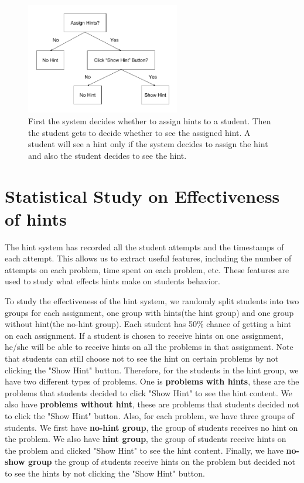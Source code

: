 \documentclass{article} %
\begin{document}
\begin{figure}[ht]
   \centering
   \includegraphics[width=0.6\textwidth]{image/Show_Hint.png}
   \caption{First the system decides whether to assign hints to a student. Then the student gets to decide whether to see the assigned hint. A student will see a hint only if the system decides to assign the hint and also the student decides to see the hint.}
   \label{fig:show_hint}
\end{figure}


\section{Statistical Study on Effectiveness of hints}
The hint system has recorded all the student attempts and the timestamps of each attempt. This allows us to extract useful features, including the number of attempts on each problem, time spent on each problem, etc. These features are used to study what effects hints make on students behavior.

To study the effectiveness of the hint system, we randomly split students into two groups for each assignment, one group with hints(the hint group) and one group without hint(the no-hint group). Each student has 50\% chance of getting a hint on each assignment. If a student is chosen to receive hints on one assignment, he/she will be able to receive hints on all the problems in that assignment. Note that students can still choose not to see the hint on certain problems by not clicking the "Show Hint" button. Therefore, for the students in the hint group, we have two different types of problems. One is \textbf{problems with hints}, these are the problems that students decided to click "Show Hint" to see the hint content. We also have \textbf{problems without hint}, these are problems that students decided not to click the "Show Hint" button. Also, for each problem, we have three groups of students. We first have \textbf{no-hint group}, the group of students receives no hint on the problem. We also have \textbf{hint group}, the group of students receive hints on the problem and clicked "Show Hint" to see the hint content. Finally, we have \textbf{no-show group} the group of students receive hints on the problem but decided not to see the hints by not clicking the "Show Hint" button.
\end{document}
